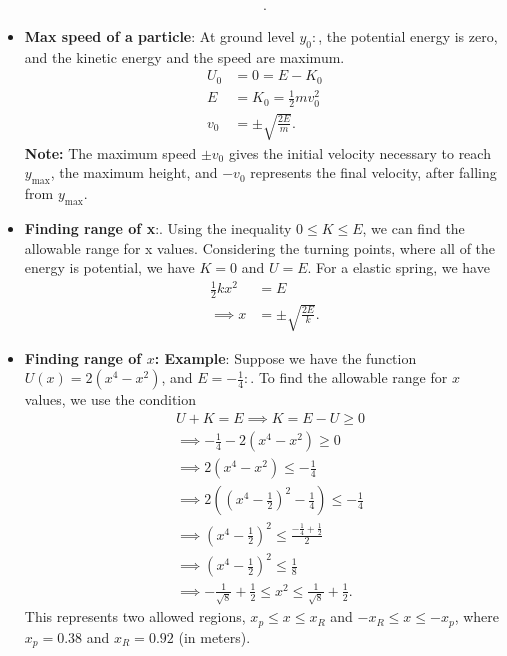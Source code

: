 \documentclass{report}
\begin{document}
\begin{itemize}
\begin{align*}
        .\end{align*}
    \item \textbf{Max speed of a particle}: At ground level $y_{0}:$, the potential energy is zero, and the kinetic energy and the speed are maximum.
        \begin{align*}
            U_{0} &= 0 = E -K_{0} \\
            E&=K_{0}=\frac{1}{2}mv_{0}^{2} \\
            v_{0} &= \pm \sqrt{\frac{2E}{m}}
        .\end{align*}
        \bigbreak \noindent 
        \textbf{Note:} The maximum speed  $\pm v_{0}$ gives the initial velocity necessary to reach  $y_{\text{max}}$, the maximum height, and  $-v_{0}$ represents the final velocity, after falling from $y_{\text{max}}$.
    \item \textbf{Finding range of x}:. Using the inequality $0 \leq K \leq E $, we can find the allowable range for x values. Considering the turning points, where all of the energy is potential, we have $K=0$ and $U=E$. For a elastic spring, we have
        \begin{align*}
            \frac{1}{2}kx^{2} &= E \\
            \implies x &= \pm \sqrt{\frac{2E}{k}}
        .\end{align*}
    \item \textbf{Finding range of $x$: Example}: Suppose we have the function $U(x) = 2(x^{4} - x^{2})$, and $E=-\frac{1}{4}:$. To find the allowable range for $x$ values, we use the condition
        \begin{align*}
            &U+K = E \implies K = E - U \geq 0 \\
            &\implies -\frac{1}{4} - 2(x^{4}-x^{2}) \geq 0  \\
            &\implies 2\left(x^{4}-x^{2}\right) \leq -\frac{1}{4} \\
            &\implies 2\left(\left(x^{4}-\frac{1}{2}\right)^{2} - \frac{1}{4}\right) \leq -\frac{1}{4} \\
            &\implies \left(x^{4}-\frac{1}{2}\right)^{2} \leq \frac{-\frac{1}{4} + \frac{1}{2}}{2} \\
            &\implies \left(x^{4}-\frac{1}{2}\right)^{2} \leq \frac{1}{8} \\
            &\implies -\frac{1}{\sqrt{8}} + \frac{1}{2} \leq x^{2} \leq \frac{1}{\sqrt{8}} + \frac{1}{2}
        .\end{align*}
        \bigbreak \noindent 
        This represents two allowed regions, \(x_p \leq x \leq x_R\) and \(-x_R \leq x \leq -x_p\), where \(x_p = 0.38\) and \(x_R = 0.92\) (in meters).

\end{itemize}
\end{document}
